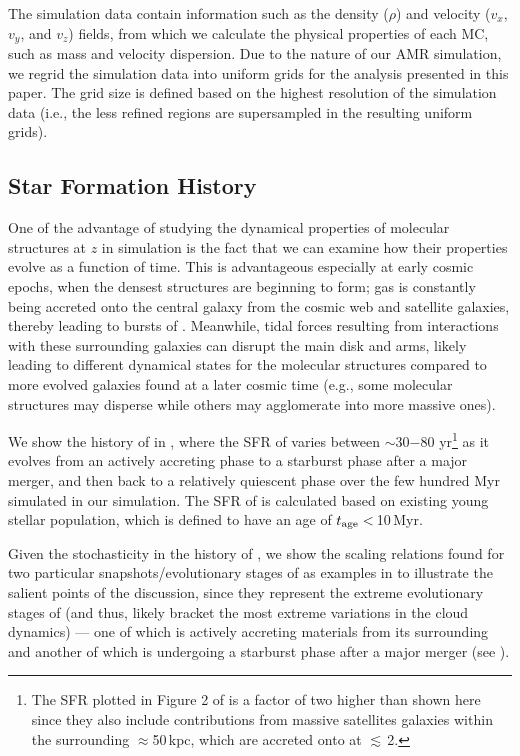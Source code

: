 \documentclass[iop]{emulateapj} %
\begin{document}
The simulation data contain information such as the density ($\rho$) and velocity ($v_x$, $v_y$, and $v_z$) fields, from which we calculate 
the physical properties of each MC, such as mass and velocity dispersion.
Due to the nature of our AMR simulation, we regrid the simulation data into uniform grids for the analysis presented in this paper. 
The grid size is defined 
based on the highest resolution of the simulation data (i.e., the less refined regions are supersampled in the resulting uniform grids). 



\subsection{Star Formation History} \label{sec:sfh}
One of the advantage of studying the dynamical properties of molecular structures at
$z$ in simulation is the fact that we can examine how their properties evolve
as a function of time.
This is advantageous especially at early cosmic epochs,
when the densest structures are beginning to form;
gas is constantly being accreted onto the central galaxy from the cosmic web and
satellite galaxies, thereby leading to bursts of \SF.
Meanwhile, tidal forces resulting from interactions with these surrounding
galaxies can disrupt the main disk and arms, likely leading to different dynamical states
for the molecular structures compared to more evolved galaxies found at 
a later cosmic time (e.g., some molecular structures may disperse while others may agglomerate into more massive
ones). %

We show the \SF history of \flower in , where
the SFR of \flower varies between $\sim$30$-$80\,\Msun\,yr\pmOne\footnote{
The SFR plotted in Figure 2 of \citet{Pallottini17b}
is a factor of two higher than shown here since they also include contributions from
massive satellites galaxies within the surrounding $\approx$50\,kpc, which
are accreted onto \flower at \z$\lesssim$\,2.}
as it evolves from an actively accreting phase to
a starburst phase after a major merger, and then back to a relatively quiescent phase
over the few hundred Myr simulated in our simulation.
The SFR of \flower is calculated based on existing young stellar population, which is
defined to have an age of $t_{\rm age}<$\,10\,Myr.

Given the stochasticity in the \SF history of \flower,
we show the scaling relations found for two particular snapshots/evolutionary stages of \flower
as examples in  to illustrate the salient points of the discussion,
since they represent the extreme evolutionary stages of \flower (and thus, likely bracket the
most extreme variations in the cloud dynamics) --- one of which \flower is
actively accreting materials from its surrounding 
and another of which \flower is undergoing
a starburst phase after a major merger (see ).
\end{document}
